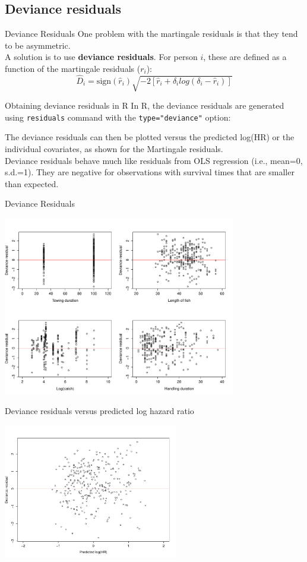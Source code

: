 \documentclass[envcountsect, 10pt, portrait, palatino]{beamer}
\begin{document}
\subsection{Deviance residuals}
\begin{frame}{Deviance Residuals}
One problem with the martingale residuals is that they tend to be
asymmetric.
\\[2ex]
A solution is to use {\bf deviance residuals}.
For person $i$, these are defined as a function of the
martingale residuals ($r_i$):
\[ \hat{D}_i  =   \mbox{sign}(\hat{r}_i)  \sqrt{-2[\hat{r}_i +
                   \delta_i log(\delta_i-\hat{r}_i)]}  \]
\end{frame}
\begin{frame}[fragile]{Obtaining deviance residuals in R}
In R, the deviance residuals are generated using {\tt residuals} command with the {\tt type="deviance"} option:

The deviance residuals can then be plotted versus the predicted log(HR) or the
individual covariates, as shown for the Martingale residuals.
\\[2ex]
Deviance residuals behave much like residuals from OLS regression (i.e., mean=0, s.d.=1).  They are negative for observations with survival times that are smaller than expected.
\end{frame}
\begin{frame}{ Deviance Residuals}
\vspace{-0.1in}
\centerline{\includegraphics[width=4in]{dev_res.pdf}}
\end{frame}
\begin{frame}{Deviance residuals versus predicted log hazard ratio}
\centerline{\includegraphics[width=3in]{devres_pred.pdf}}
\end{frame}
\end{document}
